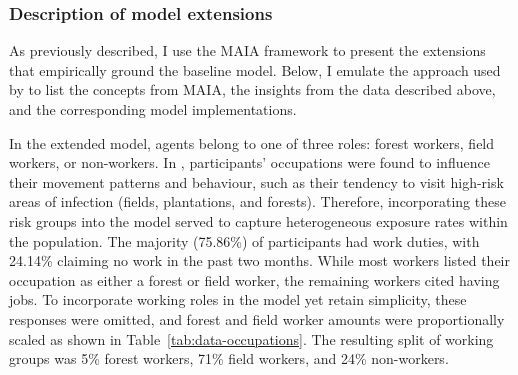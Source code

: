 \begin{figure}[hbt!]
     \centering
     \resizebox{0.75\textwidth}{!}{
        
     }
    \label{fig:extended-model-i}
\end{figure}


\subsubsection{Description of model extensions}\label{sec:ch4-extensions}

As previously described, I use the MAIA framework to present the extensions that empirically ground the baseline model. Below, I emulate the approach used by \citet{ghorbani_structuring_2015} to list the concepts from MAIA, the insights from the data described above, and the corresponding model implementations.


In the extended model, agents belong to one of three roles: forest workers, field workers, or non-workers. In \citet{sandfort_forest_2020}, participants' occupations were found to influence their movement patterns and behaviour, such as their tendency to visit high-risk areas of infection (fields, plantations, and forests). Therefore, incorporating these risk groups into the model served to capture heterogeneous exposure rates within the population. The majority (75.86\%) of participants had work duties, with 24.14\% claiming no work in the past two months. While most workers listed their occupation as either a forest or field worker, the remaining workers cited having  jobs. To incorporate working roles in the model yet retain simplicity, these responses were omitted, and forest and field worker amounts were proportionally scaled as shown in Table~\ref{tab:data-occupations}. The resulting split of working groups was 5\% forest workers, 71\% field workers, and 24\% non-workers.

